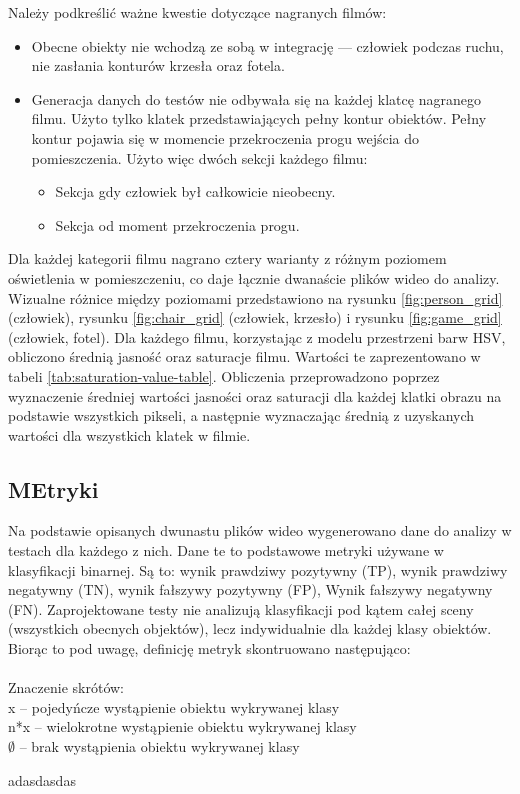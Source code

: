 Należy podkreślić ważne kwestie dotyczące nagranych filmów:
\begin{itemize}
    \item Obecne obiekty nie wchodzą ze sobą w integrację --- człowiek podczas ruchu, nie zasłania konturów krzesła oraz fotela.
    \item Generacja danych do testów nie odbywała się na każdej klatcę nagranego filmu. Użyto tylko klatek przedstawiających pełny kontur obiektów. Pełny kontur pojawia się w momencie przekroczenia progu wejścia do pomieszczenia. Użyto więc dwóch sekcji każdego filmu:
    \begin{itemize}
        \item Sekcja gdy człowiek był całkowicie nieobecny.
        \item Sekcja od moment przekroczenia progu.
    \end{itemize}
\end{itemize}

Dla każdej kategorii filmu nagrano cztery warianty z różnym poziomem oświetlenia w pomieszczeniu, co daje łącznie dwanaście plików wideo do analizy. Wizualne różnice między poziomami przedstawiono na rysunku \ref{fig:person_grid} (człowiek), rysunku \ref{fig:chair_grid} (człowiek, krzesło) i rysunku \ref{fig:game_grid} (człowiek, fotel). 
Dla każdego filmu, korzystając z modelu przestrzeni barw HSV, obliczono średnią jasność oraz saturacje filmu. Wartości te zaprezentowano w tabeli \ref{tab:saturation-value-table}. Obliczenia przeprowadzono poprzez wyznaczenie średniej wartości jasności oraz saturacji dla każdej klatki obrazu na podstawie wszystkich pikseli, a następnie wyznaczając średnią z uzyskanych wartości dla wszystkich klatek w filmie.











\subsection{MEtryki}
Na podstawie opisanych dwunastu plików wideo wygenerowano dane do analizy w testach dla każdego z nich. Dane te to podstawowe metryki używane w klasyfikacji binarnej. Są to: wynik prawdziwy pozytywny (TP), wynik prawdziwy negatywny (TN), wynik fałszywy pozytywny (FP), Wynik fałszywy negatywny (FN). Zaprojektowane testy nie analizują klasyfikacji pod kątem całej sceny (wszystkich obecnych objektów), lecz indywidualnie dla każdej klasy obiektów. Biorąc to pod uwagę, definicję metryk skontruowano następująco: \\\\ \noindent
Znaczenie skrótów: \\
x -- pojedyńcze wystąpienie obiektu wykrywanej klasy \\
n*x -- wielokrotne wystąpienie obiektu wykrywanej klasy \\
$\emptyset$ -- brak wystąpienia obiektu wykrywanej klasy 

adasdasdas

